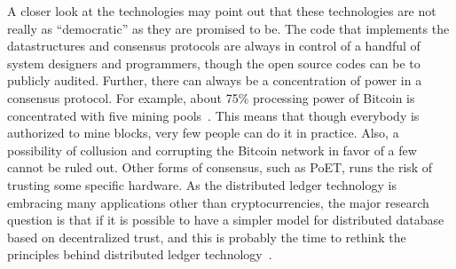 A closer look at the technologies may point out that these technologies are not really as ``democratic'' as they are promised
to be. The code that implements the datastructures and consensus protocols are always in control of a handful of system designers
and programmers, though the open source codes can be to publicly audited. Further, there can always be a concentration of power in
a consensus protocol. For example, about 75\% processing power of Bitcoin is concentrated with five mining pools~\citep{Ferdous:2021}.
This means that though everybody is authorized to mine blocks, very few people can do it in practice. Also, a possibility of collusion
and corrupting the Bitcoin network in favor of a few cannot be ruled out. Other forms of consensus, such as PoET, runs the risk
of trusting some specific hardware. As the distributed ledger technology is embracing many applications other than cryptocurrencies,
the major research question is that if it is possible to have a simpler model for distributed database based on decentralized trust,
and this is probably the time to rethink the principles behind distributed ledger technology~\citep{Kuhn:2019}.
